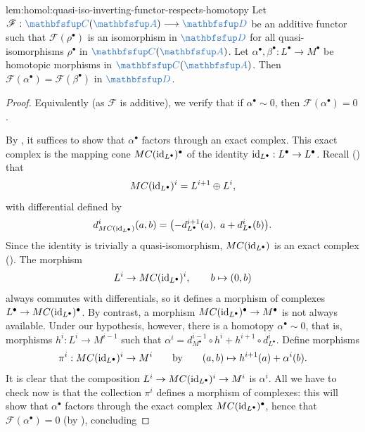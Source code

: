 \begin{lem}{}{lem:homol:quasi-iso-inverting-functor-respects-homotopy}
  Let $\mathscr{F} : \categ{C}(\categ{A}) \longrightarrow \categ{D}$
  be an additive functor such that $\mathscr{F}(\rho^\bullet)$ is an
  isomorphism in $\categ{D}$ for all quasi-isomorphisms $\rho^\bullet$
  in $\categ{C}(\categ{A})$.  Let
  $\alpha^\bullet, \beta^\bullet : L^\bullet \to M^\bullet$ be
  homotopic morphisms in $\categ{C}(\categ{A})$. Then
  $\mathscr{F}(\alpha^\bullet) = \mathscr{F}(\beta^\bullet)$ in
  $\categ{D}$.
\end{lem}
\begin{proof}
  Equivalently (as $\mathscr{F}$ is additive), we verify that if
  $\alpha^\bullet \sim 0$, then $\mathscr{F}(\alpha^\bullet) = 0$.

  By , it suffices to show that $\alpha^\bullet$
  factors through an exact complex. This exact complex is the mapping
  cone $MC(\operatorname{id}_{L^\bullet})^\bullet$ of the identity
  $\operatorname{id}_{L^\bullet} : L^\bullet \to L^\bullet$. Recall
  () that
  \[
    MC(\operatorname{id}_{L^\bullet})^i = L^{i+1} \oplus L^i,
  \]
  with differential defined by
  \[
    d^i_{MC(\operatorname{id}_{L^\bullet})}(a, b) = \bigl(-d^{i+1}_{L^\bullet}(a),\;
    a + d^i_{L^\bullet}(b)\bigr).
  \]
  Since the identity is trivially a quasi-isomorphism,
  $MC(\operatorname{id}_{L^\bullet})$ is an exact complex (). The
  morphism
  \[
    L^i \to MC(\operatorname{id}_{L^\bullet})^i, \qquad b \mapsto (0, b)
  \]
  always commutes with differentials, so it defines a morphism of
  complexes $L^\bullet \to MC(\operatorname{id}_{L^\bullet})^\bullet$.  By contrast,
  a morphism $MC(\operatorname{id}_{L^\bullet})^\bullet \to M^\bullet$ is not always
  available. Under our hypothesis, however, there is a homotopy
  $\alpha^\bullet \sim 0$, that is, morphisms $h^i : L^i \to M^{i-1}$
  such that
  $\alpha^i = d^{i-1}_{M^\bullet} \circ h^i + h^{i+1} \circ
  d^i_{L^\bullet}$. Define morphisms
  \[
    \pi^i : MC(\operatorname{id}_{L^\bullet})^i \to M^i \qquad \text{by} \qquad (a,
    b) \mapsto h^{i+1}(a) + \alpha^i(b).
  \]
  It is clear that the composition
  $L^i \to MC(\operatorname{id}_{L^\bullet})^i \to M^i$ is $\alpha^i$. All we have
  to check now is that the collection $\pi^i$ defines a morphism of
  complexes: this will show that $\alpha^\bullet$ factors through the
  exact complex $MC(\operatorname{id}_{L^\bullet})^\bullet$, hence that
  $\mathscr{F}(\alpha^\bullet) = 0$ (by ), concluding

\end{proof}
